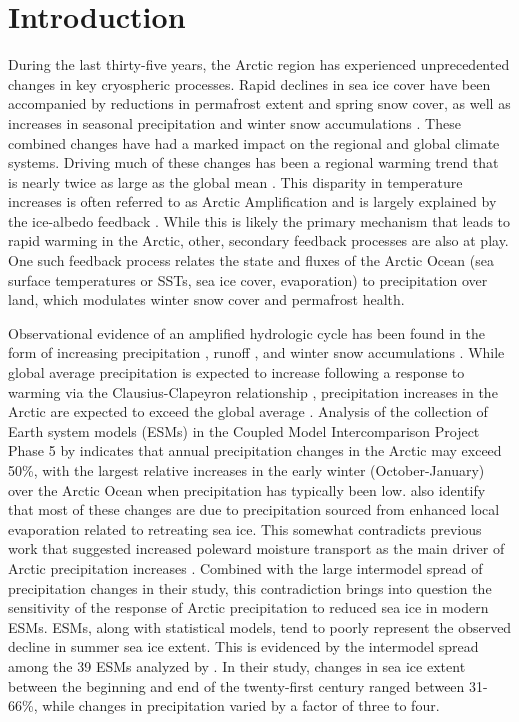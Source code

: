 \section{Introduction}
\label{sec:intro_ch5}

During the last thirty-five years, the Arctic region has experienced unprecedented changes in key cryospheric processes.
Rapid declines in sea ice cover have been accompanied by reductions in permafrost extent and spring snow cover, as well as increases in seasonal precipitation and winter snow accumulations \citep{Kohler_2006,Callaghan_2011,Bulygina_2009,Screen_2012}.
These combined changes have had a marked impact on the regional and global climate systems.
Driving much of these changes has been a regional warming trend that is nearly twice as large as the global mean \citep{Serreze_2006c,Screen_2010}.
This disparity in temperature increases is often referred to as Arctic Amplification and is largely explained by the ice-albedo feedback \citep{Curry_1995}.
While this is likely the primary mechanism that leads to rapid warming in the Arctic, other, secondary feedback processes are also at play.
One such feedback process relates the state and fluxes of the Arctic Ocean (sea surface temperatures or SSTs, sea ice cover, evaporation) to precipitation over land, which modulates winter snow cover and permafrost health.

Observational evidence of an amplified hydrologic cycle \citep{Stocker_2005} has been found in the form of increasing precipitation \citep{Rawlins_2006}, runoff \citep{Peterson_2002}, and winter snow accumulations \citep{Kohler_2006,Bulygina_2009,Screen_2012}.
While global average precipitation is expected to increase following a response to warming via the Clausius-Clapeyron relationship \citep[e.g.][]{Held_2006,Stephens_2008,Byrne_2015}, precipitation increases in the Arctic are expected to exceed the global average \citep{Stocker_2005}.
Analysis of the collection of Earth system models (ESMs) in the Coupled Model Intercomparison Project Phase 5 \citep[CMIP5;][]{Taylor_2012} by \citet{Bintanja_2014} indicates that annual precipitation changes in the Arctic may exceed 50\%, with the largest relative increases in the early winter (October-January) over the Arctic Ocean when precipitation has typically been low.
\citet{Bintanja_2014} also identify that most of these changes are due to precipitation sourced from enhanced local evaporation related to retreating sea ice.
This somewhat contradicts previous work that suggested increased poleward moisture transport as the main driver of Arctic precipitation increases \citep{Bengtsson_2011}.
Combined with the large intermodel spread of precipitation changes in their study, this contradiction brings into question the sensitivity of the response of Arctic precipitation to reduced sea ice in modern ESMs.
ESMs, along with statistical models, tend to poorly represent the observed decline in summer sea ice extent.
This is evidenced by the intermodel spread among the 39 ESMs analyzed by \citet{Bintanja_2014}.
In their study, changes in sea ice extent between the beginning and end of the twenty-first century ranged between 31-66\%, while changes in precipitation varied by a factor of three to four.

